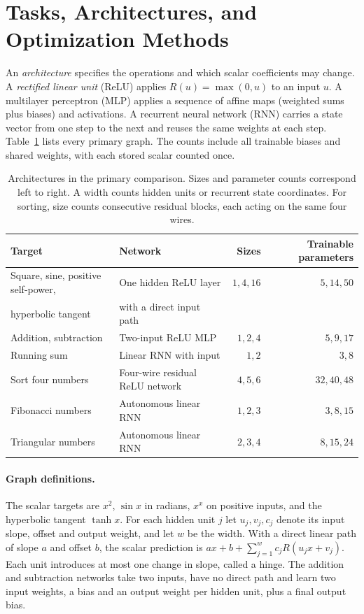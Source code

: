 \section{Tasks, Architectures, and Optimization Methods}\label{sec:matched}
An \emph{architecture} specifies the operations and which scalar coefficients may change. A \emph{rectified linear unit} (ReLU) applies $R(u)=\max(0,u)$ to an input $u$. A multilayer perceptron (MLP) applies a sequence of affine maps (weighted sums plus biases) and activations. A recurrent neural network (RNN) carries a state vector from one step to the next and reuses the same weights at each step. Table~\ref{tab:architecture} lists every primary graph. The counts include all trainable biases and shared weights, with each stored scalar counted once.

\begin{table}[htbp]\centering\small
\caption{Architectures in the primary comparison. Sizes and parameter counts correspond left to right. A width counts hidden units or recurrent state coordinates. For sorting, size counts consecutive residual blocks, each acting on the same four wires.}\label{tab:architecture}
\begin{tabular}{@{}llrr@{}}\toprule
Target & Network & Sizes & Trainable parameters\\\midrule
Square, sine, positive self-power, & One hidden ReLU layer & $1,4,16$ & $5,14,50$\\
\quad hyperbolic tangent & with a direct input path & & \\
Addition, subtraction & Two-input ReLU MLP & $1,2,4$ & $5,9,17$\\
Running sum & Linear RNN with input & $1,2$ & $3,8$\\
Sort four numbers & Four-wire residual ReLU network & $4,5,6$ & $32,40,48$\\
Fibonacci numbers & Autonomous linear RNN & $1,2,3$ & $3,8,15$\\
Triangular numbers & Autonomous linear RNN & $2,3,4$ & $8,15,24$\\\bottomrule
\end{tabular}\end{table}

\paragraph{Graph definitions.}
The scalar targets are $x^2$, $\sin x$ in radians, $x^x$ on positive inputs, and the hyperbolic tangent $\tanh x$. For each hidden unit $j$ let $u_j,v_j,c_j$ denote its input slope, offset and output weight, and let $w$ be the width. With a direct linear path of slope $a$ and offset $b$, the scalar prediction is $ax+b+\sum_{j=1}^w c_j R(u_jx+v_j)$. Each unit introduces at most one change in slope, called a hinge. The addition and subtraction networks take two inputs, have no direct path and learn two input weights, a bias and an output weight per hidden unit, plus a final output bias.

